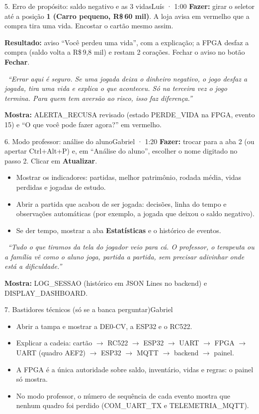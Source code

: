 \documentclass[11pt,a4paper]{article}
\newcommand{\fala}[1]{\par\smallskip\noindent\textcolor{verde}{\faComment[regular]}\ \textit{``#1''}\par}
\begin{document}
\begin{passo}{5. Erro de propósito: saldo negativo e as 3 vidas}{Luís · 1:00}
\textbf{Fazer:} girar o seletor até a posição \textbf{1 (Carro pequeno, R\$\,60 mil)}. A loja avisa em vermelho que a compra
tira uma vida. Encostar o cartão mesmo assim.

\textbf{Resultado:} aviso ``Você perdeu uma vida'', com a explicação; a FPGA desfaz a compra (saldo volta a R\$\,9,8 mil)
e restam 2 corações. Fechar o aviso no botão \textbf{Fechar}.
\fala{Errar aqui é seguro. Se uma jogada deixa o dinheiro negativo, o jogo desfaz a jogada, tira uma vida e explica o que
aconteceu. Só na terceira vez o jogo termina. Para quem tem aversão ao risco, isso faz diferença.}
\textbf{Mostra:} ALERTA\_RECUSA revisado (estado PERDE\_VIDA na FPGA, evento 15) e ``O que você pode fazer agora?'' em vermelho.
\end{passo}

\begin{passo}{6. Modo professor: análise do aluno}{Gabriel · 1:20}
\textbf{Fazer:} trocar para a aba 2 (ou apertar Ctrl+Alt+P) e, em ``Análise do aluno'', escolher o nome digitado no passo 2.
Clicar em \textbf{Atualizar}.
\begin{itemize}
  \item Mostrar os indicadores: partidas, melhor patrimônio, rodada média, vidas perdidas e jogadas de estudo.
  \item Abrir a partida que acabou de ser jogada: decisões, linha do tempo e observações automáticas
        (por exemplo, a jogada que deixou o saldo negativo).
  \item Se der tempo, mostrar a aba \textbf{Estatísticas} e o histórico de eventos.
\end{itemize}
\fala{Tudo o que tiramos da tela do jogador veio para cá. O professor, o terapeuta ou a família vê como o aluno joga,
partida a partida, sem precisar adivinhar onde está a dificuldade.}
\textbf{Mostra:} LOG\_SESSAO (histórico em JSON Lines no backend) e DISPLAY\_DASHBOARD.
\end{passo}

\begin{passo}{7. Bastidores técnicos (só se a banca perguntar)}{Gabriel}
\begin{itemize}
  \item Abrir a tampa e mostrar a DE0-CV, a ESP32 e o RC522.
  \item Explicar a cadeia: cartão $\rightarrow$ RC522 $\rightarrow$ ESP32 $\rightarrow$ UART $\rightarrow$ FPGA
        $\rightarrow$ UART (quadro AEF2) $\rightarrow$ ESP32 $\rightarrow$ MQTT $\rightarrow$ backend $\rightarrow$ painel.
  \item A FPGA é a única autoridade sobre saldo, inventário, vidas e regras: o painel só mostra.
  \item No modo professor, o número de sequência de cada evento mostra que nenhum quadro foi perdido (COM\_UART\_TX e TELEMETRIA\_MQTT).
\end{itemize}
\end{passo}
\end{document}
